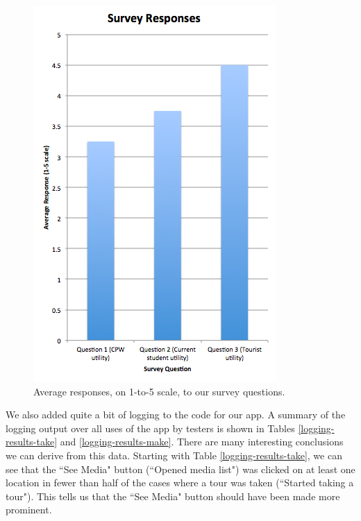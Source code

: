 \documentclass{sigchi}
\begin{document}
\begin{figure}
\centering
\includegraphics[width=1.0\linewidth]{./survey-responses.png}
\caption{Average responses, on 1-to-5 scale, to our survey questions.}
\label{survey-results}
\end{figure}

We also added quite a bit of logging to the code for our app. A summary of the logging output over all uses of the app by testers is shown in Tables \ref{logging-results-take} and \ref{logging-results-make}. There are many interesting conclusions we can derive from this data. Starting with Table \ref{logging-results-take}, we can see that the ``See Media" button (``Opened media list") was clicked on at least one location in fewer than half of the cases where a tour was taken (``Started taking a tour"). This tells us that the ``See Media" button should have been made more prominent.
\end{document}
